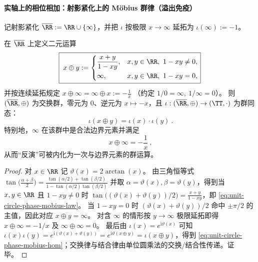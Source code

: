 \paragraph{实轴上的相位相加：射影紧化上的 Möbius 群律（溢出免疫）}
记射影紧化 \(\overline{\RR}:=\RR\cup\{\infty\}\)，并把 \(\iota\) 按极限 \(x\to\infty\) 延拓为 \(\iota(\infty):=-1\)。
\begin{proposition}\label{prop:unit-circle-phase-mobius-law}
在 \(\overline{\RR}\) 上定义二元运算
\begin{equation}\label{eq:unit-circle-phase-mobius-law}
\boxed{\;
x\oplus y:=
\begin{cases}
\dfrac{x+y}{1-xy}, & x,y\in\RR,\ 1-xy\neq 0,\\[6pt]
\infty, & x,y\in\RR,\ 1-xy=0,
\end{cases}
}
\end{equation}
并按连续延拓规定
\(
x\oplus \infty=\infty\oplus x:=-\frac{1}{x}
\)
（约定 \(1/0=\infty,\ 1/\infty=0\)）。
则 \((\overline{\RR},\oplus)\) 为交换群，零元为 \(0\)、逆元为 \(x\mapsto -x\)，且 \(\iota:(\overline{\RR},\oplus)\to(\TT,\cdot)\) 为群同态：
\begin{equation}\label{eq:unit-circle-phase-mobius-hom}
\boxed{\ \iota(x\oplus y)=\iota(x)\cdot\iota(y)\ }.
\end{equation}
特别地，\(\infty\) 在该群中是合法边界元素并满足
\begin{equation}\label{eq:unit-circle-phase-inversion-as-translation}
\boxed{\ x\oplus\infty=-\frac1x\ },
\end{equation}
从而“反演”可被内化为一次与边界元素的群运算。
\end{proposition}
\begin{proof}
对 \(x\in\RR\) 记 \(\vartheta(x)=2\arctan(x)\)。
由三角恒等式
\(
\tan\!\bigl(\frac{\alpha+\beta}{2}\bigr)=\frac{\tan(\alpha/2)+\tan(\beta/2)}{1-\tan(\alpha/2)\tan(\beta/2)}
\)
并取 \(\alpha=\vartheta(x),\beta=\vartheta(y)\)，得到当 \(x,y\in\RR\) 且 \(1-xy\neq 0\) 时
\(
\tan\!\bigl((\vartheta(x)+\vartheta(y))/2\bigr)=\frac{x+y}{1-xy}
\)，即 \eqref{eq:unit-circle-phase-mobius-law}。
当 \(1-xy=0\) 时 \((\vartheta(x)+\vartheta(y))/2\) 命中 \(\pm\pi/2\) 的主值，因此对应 \(x\oplus y=\infty\)。
对含 \(\infty\) 的情形按 \(y\to\infty\) 极限延拓即得 \(x\oplus\infty=-1/x\) 及 \(\infty\oplus\infty=0\)。
最后由
\(
\iota(x)=e^{\mathrm{i}\vartheta(x)}
\)
可知
\(
\iota(x)\iota(y)=e^{\mathrm{i}(\vartheta(x)+\vartheta(y))}=e^{\mathrm{i}\vartheta(x\oplus y)}=\iota(x\oplus y)
\)，得到 \eqref{eq:unit-circle-phase-mobius-hom}；交换律与结合律由单位圆乘法的交换/结合性传递。证毕。
\end{proof}

